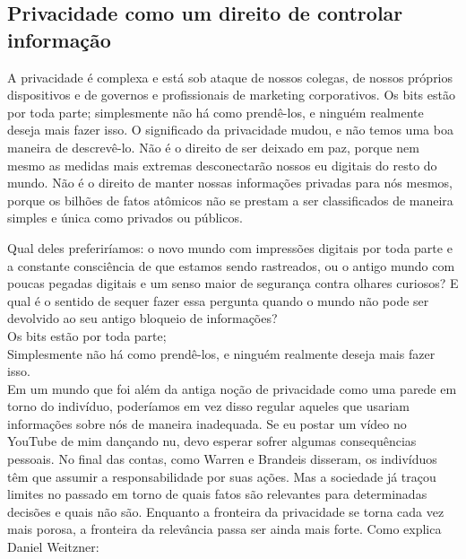 \documentclass{book}
\begin{document}
\subsection{Privacidade como um direito de controlar informação}
\label{cap3:quem-principios-controlar}
A privacidade é complexa e está sob ataque de nossos colegas, de nossos próprios
dispositivos e de governos e profissionais de marketing corporativos. Os bits
estão por toda parte; simplesmente não há como prendê-los, e ninguém realmente
deseja mais fazer isso. O significado da privacidade mudou, e não temos uma boa
maneira de descrevê-lo. Não é o direito de ser deixado em paz, porque nem mesmo
as medidas mais extremas desconectarão nossos eu digitais do resto do mundo.
Não é o direito de manter nossas informações privadas para nós mesmos, porque
os bilhões de fatos atômicos não se prestam a ser classificados de maneira
simples e única como privados ou públicos.

Qual deles preferiríamos: o novo mundo com impressões digitais por toda parte e
a constante consciência de que estamos sendo rastreados, ou o antigo mundo com
poucas pegadas digitais e um senso maior de segurança contra olhares curiosos?
E qual é o sentido de sequer fazer essa pergunta quando o mundo não pode ser
devolvido ao seu antigo bloqueio de informações?\\

Os bits estão por toda parte;\\ Simplesmente não há como prendê-los, e ninguém
realmente deseja mais fazer isso.\\

Em um mundo que foi além da antiga noção de privacidade como uma parede em
torno do indivíduo, poderíamos em vez disso regular aqueles que usariam
informações sobre nós de maneira inadequada. Se eu postar um vídeo no YouTube
de mim dançando nu, devo esperar sofrer algumas consequências pessoais. No
final das contas, como Warren e Brandeis disseram, os indivíduos têm que
assumir a responsabilidade por suas ações. Mas a sociedade já traçou limites no
passado em torno de quais fatos são relevantes para determinadas decisões e
quais não são. Enquanto a fronteira da privacidade se torna cada vez mais
porosa, a fronteira da relevância passa ser ainda mais forte. Como explica
Daniel Weitzner:
\end{document}
